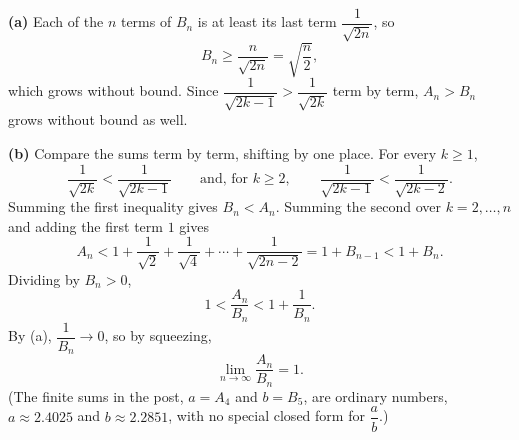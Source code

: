 \textbf{(a)} Each of the $n$ terms of $B_n$ is at least its last term $\dfrac{1}{\sqrt{2n}}$, so
\[
B_n\ge\dfrac{n}{\sqrt{2n}}=\sqrt{\dfrac {n}{2}},
\]
which grows without bound. Since $\dfrac{1}{\sqrt{2k-1}}>\dfrac{1}{\sqrt{2k}}$ term by term, $A_n>B_n$ grows without bound as well.

\textbf{(b)} Compare the sums term by term, shifting by one place. For every $k\ge1$,
\[
\dfrac{1}{\sqrt{2k}}<\dfrac{1}{\sqrt{2k-1}}\qquad\text{and, for }k\ge2,\qquad \dfrac{1}{\sqrt{2k-1}}<\dfrac{1}{\sqrt{2k-2}} .
\]
Summing the first inequality gives $B_n<A_n$. Summing the second over $k=2,\dots,n$ and adding the first term $1$ gives
\[
A_n<1+\dfrac{1}{\sqrt2}+\dfrac{1}{\sqrt4}+\cdots+\dfrac{1}{\sqrt{2n-2}}=1+B_{n-1}<1+B_n .
\]
Dividing by $B_n>0$,
\[
1<\dfrac{A_n}{B_n}<1+\dfrac{1}{B_n} .
\]
By (a), $\dfrac{1}{B_n}\to0$, so by squeezing,
\[
\lim_{n\to\infty}\dfrac{A_n}{B_n}=\boxed{1}.
\]
(The finite sums in the post, $a=A_4$ and $b=B_5$, are ordinary numbers, $a\approx2.4025$ and $b\approx2.2851$, with no special closed form for $\dfrac {a}{b}$.)
